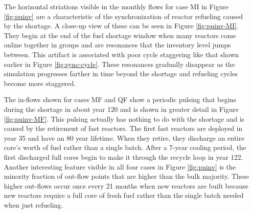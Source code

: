 \documentclass{style}
\begin{document}
The horizontal striations visible in the monthly flows for case MI in Figure
\ref{fig:puinv} are a characteristic of the synchronization of reactor
refueling caused by the shortage.  A close-up view of these can be seen in
Figure \ref{fig:puinv-MI}. They begin at the end of the fuel shortage window
when many reactors come online together in groups and are resonances that the
inventory level jumps between.  This artifact is associated with poor cycle staggering
like that shown earlier in Figure \ref{fig:sync-cycle}.
These resonances gradually disappear as the
simulation progresses farther in time beyond the shortage and refueling cycles
become more staggered.

The in-flows shown for cases MF and QF show a periodic pulsing that begins
during the shortage in about year 120 and is shown in greater detail in Figure \ref{fig:puinv-MF}. This pulsing actually has nothing to
do with the shortage and is caused by the retirement of fast reactors.  The
first fast reactors are deployed in year 35 and have an 80 year lifetime.
When they retire, they discharge an entire core's worth of fuel rather than a
single batch.  After a 7-year cooling period, the first discharged full cores
begin to make it through the recycle loop in year 122.  Another interesting
feature visible in all four cases in Figure \ref{fig:puinv} is the minority
fraction of out-flow points that are higher than the bulk majority. These
higher out-flows occur once every 21 months when new reactors are built because
new reactors require a full core of fresh fuel rather than the single batch
needed when just refueling.  
\end{document}
